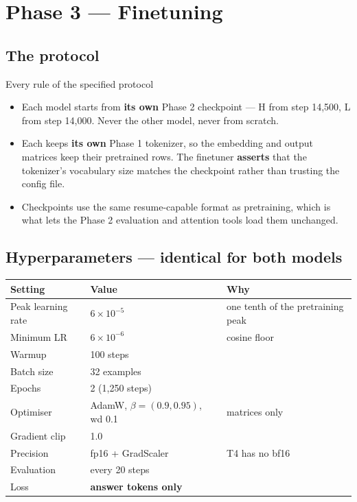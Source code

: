 \documentclass[11pt]{report}
\begin{document}
\chapter{Phase 3 --- Finetuning}

\section{The protocol}

\begin{implementation}{Every rule of the specified protocol}
\begin{itemize}
\item Each model starts from \textbf{its own} Phase 2 checkpoint --- H from step
      14,500, L from step 14,000. Never the other model, never from scratch.
\item Each keeps \textbf{its own} Phase 1 tokenizer, so the embedding and output
      matrices keep their pretrained rows. The finetuner \textbf{asserts} that
      the tokenizer's vocabulary size matches the checkpoint rather than
      trusting the config file.
\item Checkpoints use the same resume-capable format as pretraining, which is
      what lets the Phase 2 evaluation and attention tools load them unchanged.
\end{itemize}
\end{implementation}

\section{Hyperparameters --- identical for both models}

\begin{center}
\begin{tabular}{@{}lll@{}}
\toprule
\textbf{Setting} & \textbf{Value} & \textbf{Why} \\
\midrule
Peak learning rate & $6 \times 10^{-5}$ & one tenth of the pretraining peak \\
Minimum LR & $6 \times 10^{-6}$ & cosine floor \\
Warmup & 100 steps & \\
Batch size & 32 examples & \\
Epochs & 2 (1,250 steps) & \\
Optimiser & AdamW, $\beta=(0.9,0.95)$, wd 0.1 & matrices only \\
Gradient clip & 1.0 & \\
Precision & fp16 + GradScaler & T4 has no bf16 \\
Evaluation & every 20 steps & \\
Loss & \textbf{answer tokens only} & \\
\bottomrule
\end{tabular}
\end{center}
\end{document}
